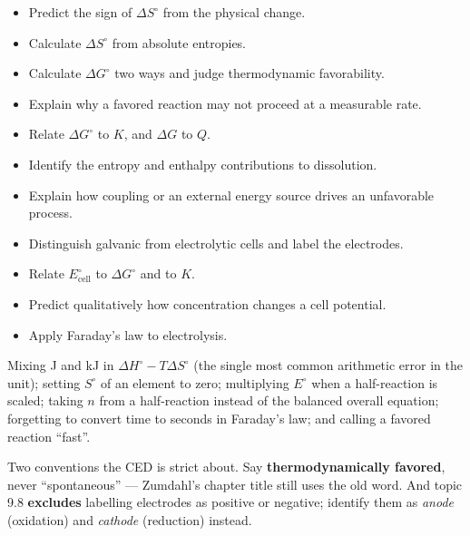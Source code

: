 \documentclass{apchem-worksheet}
\begin{document}
\begin{itemize}[leftmargin=*,itemsep=0.1em]
  \item Predict the sign of $\Delta S^\circ$ from the physical change.
  \item Calculate $\Delta S^\circ$ from absolute entropies. 
  \item Calculate $\Delta G^\circ$ two ways and judge thermodynamic
        favorability. 
  \item Explain why a favored reaction may not proceed at a measurable
        rate. 
  \item Relate $\Delta G^\circ$ to $K$, and $\Delta G$ to $Q$. 
  \item Identify the entropy and enthalpy contributions to dissolution.
  \item Explain how coupling or an external energy source drives an
        unfavorable process. 
  \item Distinguish galvanic from electrolytic cells and label the
        electrodes. 
  \item Relate $E^\circ_{\text{cell}}$ to $\Delta G^\circ$ and to $K$.
  \item Predict qualitatively how concentration changes a cell potential.
  \item Apply Faraday's law to electrolysis. 
\end{itemize}

\begin{apctrap}
Mixing J and kJ in $\Delta H^\circ - T\Delta S^\circ$ (the single most
common arithmetic error in the unit); setting $S^\circ$ of an element to
zero; multiplying $E^\circ$ when a half-reaction is scaled; taking $n$ from
a half-reaction instead of the balanced overall equation; forgetting to
convert time to seconds in Faraday's law; and calling a favored reaction
``fast''.

Two conventions the CED is strict about. Say
\textbf{thermodynamically favored}, never ``spontaneous'' --- Zumdahl's
chapter title still uses the old word. And topic 9.8 \textbf{excludes}
labelling electrodes as positive or negative; identify them as
\emph{anode} (oxidation) and \emph{cathode} (reduction) instead.
\end{apctrap}
\end{document}

